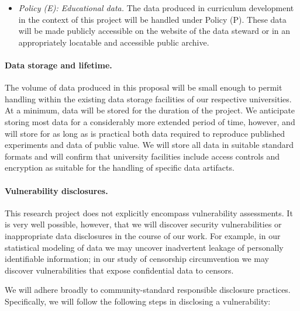 \begin{itemize}
\item {\em Policy (E): Educational data.} The data produced in curriculum
development in the context of this project will be handled under Policy (P).
These data will be made publicly accessible on the website of the data steward
or in an appropriately locatable and accessible public archive.  
\end{itemize}

\paragraph{Data storage and lifetime.} The volume of data produced in this
proposal will be small enough to permit handling within the existing data
storage facilities of our respective universities. At a minimum, data will be
stored for the duration of the project. We anticipate storing most data for a
considerably more extended period of time, however, and will store for as long
as is practical both data required to reproduce published experiments and data
of public value. We will store all data in suitable standard formats and will
confirm that university facilities include access controls and encryption as
suitable for the handling of specific data artifacts.

\paragraph{Vulnerability disclosures.} This research project does not explicitly
encompass vulnerability assessments. It is very well possible, however, that we
will discover security vulnerabilities or inappropriate data disclosures in the
course of our work. For example, in our statistical modeling of data we may
uncover inadvertent leakage of personally identifiable information; in our study
of censorship circumvention we may discover vulnerabilities that expose
confidential data to censors.

We will adhere broadly to community-standard responsible disclosure practices.
Specifically, we will follow the following steps in disclosing a vulnerability:

